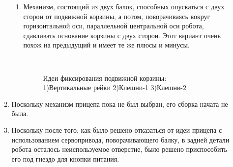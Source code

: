 \begin{enumerate}
\begin{enumerate}
\begin{enumerate}
			\item Механизм, состоящий из двух балок, способных опускаться с двух сторон от подвижной корзины, а потом, поворачиваясь вокруг горизонтальной оси, параллельной центральной оси робота, сдавливать основание корзины с двух сторон. Этот вариант очень похож на предыдущий и имеет те же плюсы и минусы.\newline
			
			\begin{figure}[H]
				\begin{minipage}[h]{0.2\linewidth}
					\center  
				\end{minipage}
				\begin{minipage}[h]{0.6\linewidth}
					\caption{Идеи фиксирования подвижной корзины: 1)Вертикальные рейки 2)Клешни-1 3)Клешни-2}
				\end{minipage}
			\end{figure}
			
		\end{enumerate}
		
		\item Поскольку механизм прицепа пока не был выбран, его сборка начата не была.\newline
		
		\item Поскольку после того, как было решено отказаться от идеи прицепа с использованием сервопривода, поворачивающего балку, в задней детали робота осталось неиспользуемое отверстие, было решено приспособить его под гнездо для кнопки питания.\newline
		

\end{enumerate}
\end{enumerate}
